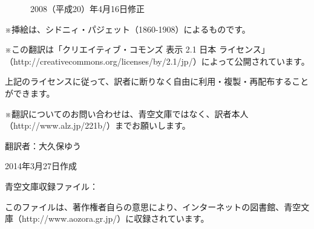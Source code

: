 \documentclass[tate,paper=b6j,jafontsize=9pt]{jlreq}
\begin{document}
　　　2008（平成20）年4月16日修正

※挿絵は、シドニィ・パジェット（1860-1908）によるものです。

※この翻訳は「クリエイティブ・コモンズ 表示 2.1 日本 ライセンス」（http://creativecommons.org/licenses/by/2.1/jp/）によって公開されています。

上記のライセンスに従って、訳者に断りなく自由に利用・複製・再配布することができます。

※翻訳についてのお問い合わせは、青空文庫ではなく、訳者本人（http://www.alz.jp/221b/）までお願いします。

翻訳者：大久保ゆう

2014年3月27日作成

青空文庫収録ファイル：

このファイルは、著作権者自らの意思により、インターネットの図書館、青空文庫（http://www.aozora.gr.jp/）に収録されています。
\end{document}
